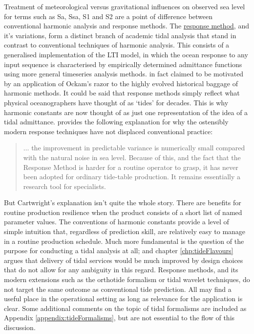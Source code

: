 Treatment of meteorological versus gravitational influences on observed sea level for terms such as Sa, Ssa, S1 and S2 are a point of difference between conventional harmonic analysis and response methods.  
The \underline{response method}, and it's variations, form a distinct branch of academic tidal analysis that stand in contrast to conventional techniques of harmonic analysis.   This consists of a generalised implementation of the LTI model, in which the ocean response to any input sequence is characterised by empirically determined admittance functions using more general timeseries analysis methods.  
\citet{Munk:1966ts} in fact claimed to be motivated by an application of Ockam's razor to the highly evolved historical baggage of harmonic methods.   
It could be said that response methods simply reflect what physical oceanographers have thought of as `tides' for decades.  This is why harmonic constants are now thought of as just one representation of the idea of a tidal admittance. 
\citep[pp 198]{Cartwright:2000tt} provides the following explanation for why the ostensibly modern response techniques have not displaced conventional practice: 
\begin{quotation} \noindent
    $\dots$ the improvement in predictable variance is numerically small compared with the natural noise in sea level.   Because of this, and the fact that the Response Method is harder for a routine operator to grasp, it has never been adopted for ordinary tide-table production. It remains essentially a research tool for specialists. 
\end{quotation}
But Cartwright's explanation isn't quite the whole story.   
There are benefits for routine production resilience when the product consists of a short list of named parameter values.   The conventions of harmonic constants provide a level of simple intuition that, regardless of prediction skill, are relatively easy to manage in a routine production schedule.
Much more fundamental is the question of the purpose for conducting a tidal analysis at all; and chapter \ref{chp:tideFlavours} argues that delivery of tidal services would be much improved by design choices that do not allow for any ambiguity in this regard.   
Response methods, and its modern extensions such as the orthotide formalism or tidal wavelet techniques, do not target the same outcome as conventional tide prediction.   All may find a useful place in the operational setting as long as relevance for the application is clear. 
Some additional comments on the topic of tidal formalisms are included as Appendix \ref{appendix:tideFormalisms}, but are not essential to the flow of this discussion.


